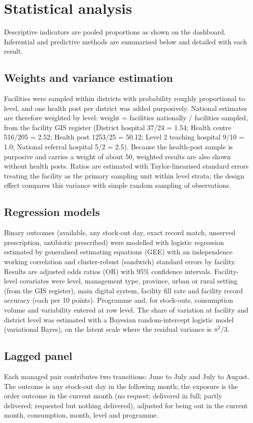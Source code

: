 \documentclass[10pt,a4paper]{report}
\begin{document}
\section{Statistical analysis}
Descriptive indicators are pooled proportions as shown on the dashboard. Inferential and predictive methods are summarised below and detailed with each result.

\subsection{Weights and variance estimation}
Facilities were sampled within districts with probability roughly proportional to level, and one health post per district was added purposively. National estimates are therefore weighted by level: weight = facilities nationally / facilities sampled, from the facility GIS register (District hospital 37/24 = 1.54; Health centre 516/205 = 2.52; Health post 1253/25 = 50.12; Level 2 teaching hospital 9/10 = 1.0; National referral hospital 5/2 = 2.5). Because the health-post sample is purposive and carries a weight of about 50, weighted results are also shown without health posts. Ratios are estimated with Taylor-linearised standard errors treating the facility as the primary sampling unit within level strata; the design effect compares this variance with simple random sampling of observations.

\subsection{Regression models}
Binary outcomes (available, any stock-out day, exact record match, unserved prescription, antibiotic prescribed) were modelled with logistic regression estimated by generalised estimating equations (GEE) with an independence working correlation and cluster-robust (sandwich) standard errors by facility. Results are adjusted odds ratios (OR) with 95\% confidence intervals. Facility-level covariates were level, management type, province, urban or rural setting (from the GIS register), main digital system, facility fill rate and facility record accuracy (each per 10 points). Programme and, for stock-outs, consumption volume and variability entered at row level. The share of variation at facility and district level was estimated with a Bayesian random-intercept logistic model (variational Bayes), on the latent scale where the residual variance is $\pi^2$/3.

\subsection{Lagged panel}
Each managed pair contributes two transitions: June to July and July to August. The outcome is any stock-out day in the following month; the exposure is the order outcome in the current month (no request; delivered in full; partly delivered; requested but nothing delivered), adjusted for being out in the current month, consumption, month, level and programme.
\end{document}
